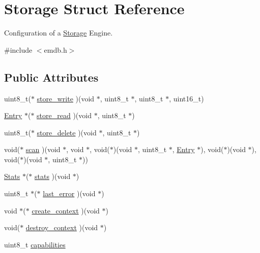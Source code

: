 \hypertarget{struct_storage}{}\section{Storage Struct Reference}
\label{struct_storage}


Configuration of a \hyperlink{struct_storage}{Storage} Engine.  




{\ttfamily \#include $<$emdb.\+h$>$}

\subsection*{Public Attributes}
\begin{DoxyCompactItemize}
\item 
uint8\+\_\+t($\ast$ \hyperlink{struct_storage_a97c4534c1944aa12f98e645427fe1cc0}{store\+\_\+write} )(void $\ast$, uint8\+\_\+t $\ast$, uint8\+\_\+t $\ast$, uint16\+\_\+t)
\item 
\hyperlink{struct_entry}{Entry} $\ast$($\ast$ \hyperlink{struct_storage_a6a57b49c99b8f97439941c2705aa9280}{store\+\_\+read} )(void $\ast$, uint8\+\_\+t $\ast$)
\item 
uint8\+\_\+t($\ast$ \hyperlink{struct_storage_ac3c5c981f9f3fc423a63f00af6172642}{store\+\_\+delete} )(void $\ast$, uint8\+\_\+t $\ast$)
\item 
void($\ast$ \hyperlink{struct_storage_a5e24b45fef757acae34cca3bb8464935}{scan} )(void $\ast$, void $\ast$, void($\ast$)(void $\ast$, uint8\+\_\+t $\ast$, \hyperlink{struct_entry}{Entry} $\ast$), void($\ast$)(void $\ast$), void($\ast$)(void $\ast$, uint8\+\_\+t $\ast$))
\item 
\hyperlink{struct_stats}{Stats} $\ast$($\ast$ \hyperlink{struct_storage_a6642751e068c1e64f8b65703a8bc51a0}{stats} )(void $\ast$)
\item 
uint8\+\_\+t $\ast$($\ast$ \hyperlink{struct_storage_a8d06a225bc4d31d734cab75608fa3cf3}{last\+\_\+error} )(void $\ast$)
\item 
void $\ast$($\ast$ \hyperlink{struct_storage_a96d6e9b9bfd5b4943eb9660ca2293447}{create\+\_\+context} )(void $\ast$)
\item 
void($\ast$ \hyperlink{struct_storage_af425b1971a9fcfed315e6aec547df8da}{destroy\+\_\+context} )(void $\ast$)
\item 
uint8\+\_\+t \hyperlink{struct_storage_a7b4013010f2549531d066e6d701c69d9}{capabilities}
\end{DoxyCompactItemize}


